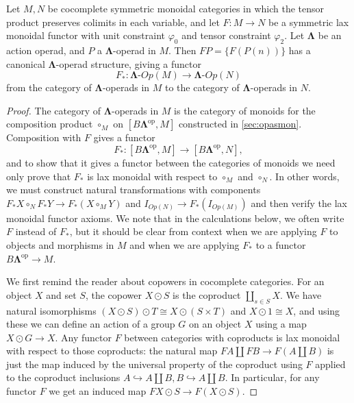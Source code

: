 \documentclass{amsbook} %
\newcommand{\mb}{\mathbf}
\numberwithin{section}{chapter}
\begin{document}
\begin{thm}\label{preserveGop}
Let $M,N$ be cocomplete symmetric monoidal categories in which the tensor product preserves colimits in each variable, and let $F:M \rightarrow N$ be a symmetric lax monoidal functor with unit constraint $\varphi_{0}$ and tensor constraint $\varphi_{2}$.  Let $\mb{\Lambda}$ be an action operad, and $P$ a $\mb{\Lambda}$-operad in $M$.  Then $FP = \{ F(P(n)) \}$ has a canonical $\mb{\Lambda}$-operad structure, giving a functor
\[
F_{*}:\mb{\Lambda}\mbox{-}Op(M) \rightarrow \mb{\Lambda}\mbox{-}Op(N)
\]
from the category of $\mb{\Lambda}$-operads in $M$ to the category of $\mb{\Lambda}$-operads in $N$.
\end{thm}
\begin{proof}
The category of $\mb{\Lambda}$-operads in $M$ is the category of monoids for the composition product $\circ_{M}$ on $[B\mb{\Lambda}^{\textrm{op}}, M]$ constructed in \cref{sec:opasmon}.  Composition with $F$ gives a functor
\[
F_{*}: [B\mb{\Lambda}^{\textrm{op}}, M] \rightarrow [B\mb{\Lambda}^{\textrm{op}}, N],
\]
and to show that it gives a functor between the categories of monoids we need only prove that $F_{*}$ is lax monoidal with respect to $\circ_{M}$ and $\circ_{N}$.  In other words, we must construct natural transformations with components $F_{*}X \circ_{N} F_{*}Y \rightarrow F_{*}(X \circ_{M} Y)$ and $I_{Op(N)} \rightarrow F_{*}(I_{Op(M)})$ and then verify the lax monoidal functor axioms.  We note that in the calculations below, we often write $F$ instead of $F_{*}$, but it should be clear from context when we are applying $F$ to objects and morphisms in $M$ and when we are applying $F_{*}$ to a functor $ B\mb{\Lambda}^{\textrm{op}} \to M$.

We first remind the reader about copowers in cocomplete categories.  For an object $X$ and set $S$, the copower $X \odot S$ is the coproduct $\coprod_{s \in S} X$.  We have natural isomorphisms $(X \odot S) \odot T \cong X \odot (S \times T)$ and $X \odot 1 \cong X$, and using these we can define an action of a group $G$ on an object $X$ using a map $X \odot G \rightarrow X$.  Any functor $F$ between categories with coproducts is lax monoidal with respect to those coproducts:  the natural map $FA \coprod FB \rightarrow F(A \coprod B)$ is just the map induced by the universal property of the coproduct using $F$ applied to the coproduct inclusions $A \hookrightarrow A \coprod B, B \hookrightarrow A \coprod B$.  In particular, for any functor $F$ we get an induced map $FX \odot S \rightarrow F(X \odot S)$.


\end{proof}
\end{document}
